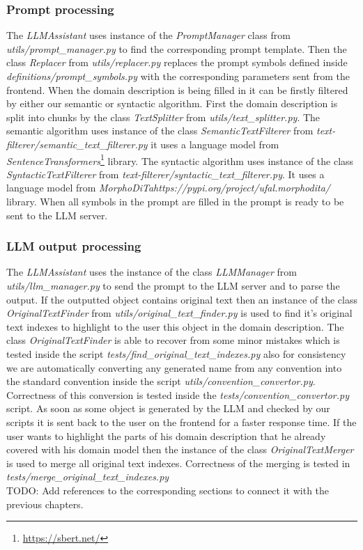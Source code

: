 \subsubsection{Prompt processing}
The \textit{LLMAssistant} uses instance of the \textit{PromptManager} class from \textit{utils/prompt\_manager.py} to find the corresponding prompt template.
Then the class \textit{Replacer} from \textit{utils/replacer.py} replaces the prompt symbols defined inside \textit{definitions/prompt\_symbols.py} with the corresponding parameters sent from the frontend. When the domain description is being filled in it can be firstly filtered by either our semantic or syntactic algorithm. First the domain description is split into chunks by the class \textit{TextSplitter} from \textit{utils/text\_splitter.py}. The semantic algorithm uses instance of the class \textit{SemanticTextFilterer} from \textit{text-filterer/semantic\_text\_filterer.py} it uses a language model from \textit{SentenceTransformers}\footnote{\url{https://sbert.net/}} library. The syntactic algorithm uses instance of the class \textit{SyntacticTextFilterer} from \textit{text-filterer/syntactic\_text\_filterer.py}. It uses a language model from \textit{MorphoDiTa}\textit{https://pypi.org/project/ufal.morphodita/} library. When all symbols in the prompt are filled in the prompt is ready to be sent to the LLM server.


\subsubsection{LLM output processing}

The \textit{LLMAssistant} uses the instance of the class \textit{LLMManager} from \textit{utils/llm\_manager.py} to send the prompt to the LLM server and to parse the output. If the outputted object contains original text then an instance of the class \textit{OriginalTextFinder} from \textit{utils/original\_text\_finder.py} is used to find it's original text indexes to highlight to the user this object in the domain description. The class \textit{OriginalTextFinder} is able to recover from some minor mistakes which is tested inside the script \textit{tests/find\_original\_text\_indexes.py}
also for consistency we are automatically converting any generated name from any convention into the standard convention inside the script \textit{utils/convention\_convertor.py}. Correctness of this conversion is tested inside the \textit{tests/convention\_convertor.py} script. As soon as some object is generated by the LLM and checked by our scripts it is sent back to the user on the frontend for a faster response time. If the user wants to highlight the parts of his domain description that he already covered with his domain model then the instance of the class \textit{OriginalTextMerger} is used to merge all original text indexes. Correctness of the merging is tested in \textit{tests/merge\_original\_text\_indexes.py} \\

\noindent{}TODO: Add references to the corresponding sections to connect it with the previous chapters.